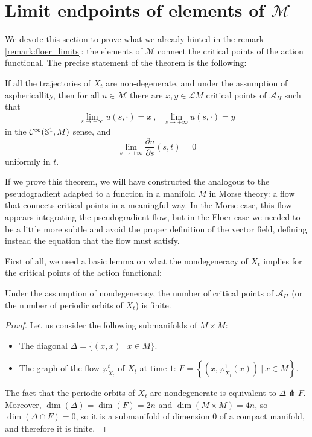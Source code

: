\section{Limit endpoints of elements of $\mathcal{M}$} \label{section:floer5}

We devote this section to prove what we already hinted in the remark \ref{remark:floer_limits}: the elements of $\mathcal{M}$ connect the critical points of the action functional. The precise statement of the theorem is the following:

\begin{theo} \label{theo:floer_endpoints}
If all the trajectories of $X_t$ are non-degenerate, and under the assumption of asphericallity, then for all $u \in \mathcal{M}$ there are $x, y \in \mathcal{L}M$ critical points of $\mathcal{A}_H$ such that
\[\lim_{s\rightarrow - \infty} u(s,\cdot) = x \ , \ \ \ \lim_{s\rightarrow +\infty} u(s,\cdot) = y\]
in the $\mathcal{C}^{\infty}(\mathbb{S}^1,M)$ sense, and
\[\lim_{s\rightarrow \pm\infty} \frac{\partial u}{\partial s} (s,t) = 0\]
uniformly in $t$.
\end{theo}

If we prove this theorem, we will have constructed the analogous to the pseudogradient adapted to a function in a manifold $M$ in Morse theory: a flow that connects critical points in a meaningful way. In the Morse case, this flow appears integrating the pseudogradient flow, but in the Floer case we needed to be a little more subtle and avoid the proper definition of the vector field, defining instead the equation that the flow must satisfy.

First of all, we need a basic lemma on what the nondegeneracy of $X_t$ implies for the critical points of the action functional:

\begin{lema} \label{lema:floer_finite}
Under the assumption of nondegeneracy, the number of critical points of $\mathcal{A}_H$ (or the number of periodic orbits of $X_t$) is finite.
\end{lema}

\begin{proof}
Let us consider the following submanifolds of $M\times M$:
\begin{itemize}
	\item The diagonal $\Delta = \{(x,x) \ | \ x \in M\}$.
	\item The graph of the flow $\varphi_{X_t}^t$ of $X_t$ at time $1$: $F = \left\{\left(x,\varphi_{X_t}^1(x)\right) \ | \ x \in M\right\}$.
\end{itemize}
The fact that the periodic orbits of $X_t$ are nondegenerate is equivalent to $\Delta \pitchfork F$. Moreover, $\dim(\Delta) = \dim(F) = 2n$ and $\dim(M\times M) = 4n$, so $\dim(\Delta \cap F) = 0$, so it is a submanifold of dimension $0$ of a compact manifold, and therefore it is finite.
\end{proof}

